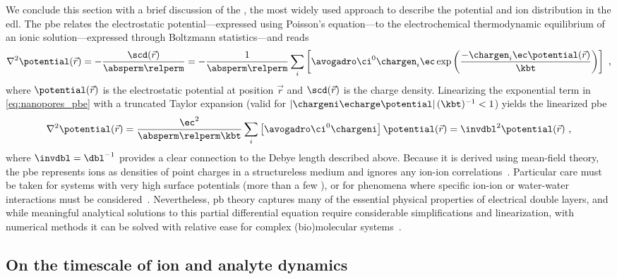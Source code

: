 We conclude this section with a brief discussion of the , the most widely used approach to
describe the potential and ion distribution in the \gls{edl}. The \gls{pbe} relates the electrostatic
potential---expressed using Poisson's equation---to the electrochemical thermodynamic equilibrium of an ionic
solution---expressed through Boltzmann statistics---and reads~\cite{Gouy-1910,Chapman-1913,Baker-2005}
%
\begin{equation}\label{eq:nanopores_pbe}
  \nabla^2 \potential(\vec{r}) = - \dfrac{\scd(\vec{r})}{\absperm \relperm}
  = - \dfrac{1}{\absperm \relperm}
  \sum_i \left[ \avogadro \ci^0 \chargen_i \ec
         \exp \left( \dfrac{-\chargen_i \ec \potential(\vec{r}) }{\kbt} \right)
        \right]
  \text{ ,}
\end{equation}
%
where $\potential(\vec{r})$ is the electrostatic potential at position $\vec{r}$ and $\scd(\vec{r})$ is the
charge density. Linearizing the exponential term in \cref{eq:nanopores_pbe} with a truncated Taylor expansion
(valid for $\left| \chargeni \echarge \potential \right| (\kbt)^{-1} < 1$) yields the linearized \gls{pbe}
%
\begin{equation}\label{eq:nanopores_pbe_linear}
  \nabla^2 \potential(\vec{r})
  = \dfrac{\ec^2}{\absperm \relperm \kbt} \sum_i \left[ \avogadro \ci^0 \chargeni \right]
      \potential(\vec{r})
  = \invdbl^2 \potential(\vec{r})
  \text{ ,}
\end{equation}
%
where $\invdbl = \dbl^{-1}$ provides a clear connection to the Debye length described above. Because it is
derived using mean-field theory, the \gls{pbe} represents ions as densities of point charges in a
structureless medium and ignores any ion-ion correlations~\cite{Bocquet-2010}. Particular care must be taken
for systems with very high surface potentials (more than a few \si{\kTe}), or for phenomena where specific
ion-ion or water-water interactions must be considered~\cite{Collins-2012}. Nevertheless, \gls{pb} theory
captures many of the essential physical properties of electrical double layers, and while meaningful
analytical solutions to this partial differential equation require considerable simplifications and
linearization, with numerical methods it can be solved with relative ease for complex (bio)molecular
systems~\cite{Baker-2001,Baker-2005}.


\subsection{On the timescale of ion and analyte dynamics}
%
\label{sec:np:dynamics}
%

